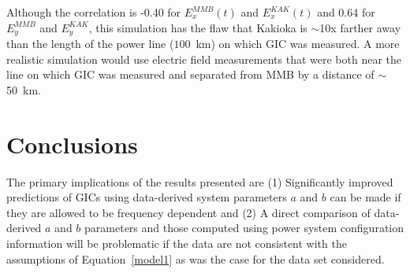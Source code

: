 \documentclass[draft,linenumbers]{agujournal2018}
\begin{document}
Although the correlation is -0.40 for $E^{MMB}_x(t)$ and $E^{KAK}_x(t)$ and 0.64 for $E^{MMB}_y$ and $E^{KAK}_y$, this simulation has the flaw that Kakioka is $\sim$10x farther away than the length of the power line ($100$~km) on which GIC was measured. A more realistic simulation would use electric field measurements that were both near the line on which GIC was measured and separated from MMB by a distance of $\sim$50~km.







\section{Conclusions}

The primary implications of the results presented are (1) Significantly improved predictions of GICs using data-derived system parameters $a$ and $b$ can be made if they are allowed to be frequency dependent and (2) A direct comparison of data-derived $a$ and $b$ parameters and those computed using power system configuration information will be problematic if the data are not consistent with the assumptions of Equation~\ref{model1} as was the case for the data set considered. 
\end{document}
